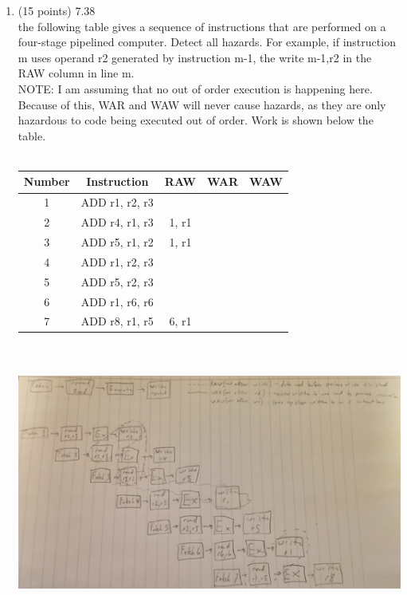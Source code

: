 \documentclass[letterpaper,10pt,onecolumn,titlepage]{article}
\begin{document}
\begin{enumerate}
\item (15 points) 7.38 \\
	the following table gives a sequence of instructions that are performed on a
	four-stage pipelined computer. Detect all hazards. For example, if instruction m
	uses operand r2 generated by instruction m-1, the write m-1,r2 in the RAW column
	in line m. \\
	NOTE: I am assuming that no out of order execution is happening here. Because of
	this, WAR and WAW will never cause hazards, as they are only hazardous to code
	being executed out of order. Work is shown below the table.\\
	\\
	\begin{tabular}{ c c c c c }
		Number & Instruction & RAW & WAR & WAW \\
		\hline
		1 & ADD r1, r2, r3 &        &        &        \\
		2 & ADD r4, r1, r3 & 1, r1  &        &        \\
		3 & ADD r5, r1, r2 & 1, r1  &        &        \\
		4 & ADD r1, r2, r3 &        &        &        \\
		5 & ADD r5, r2, r3 &        &        &        \\
		6 & ADD r1, r6, r6 &        &        &        \\
		7 & ADD r8, r1, r5 & 6, r1  &        &        \\
	\end{tabular}\\
	\\
	\includegraphics[width=5in]{images/7_38.eps} \\

\end{enumerate}
\end{document}
